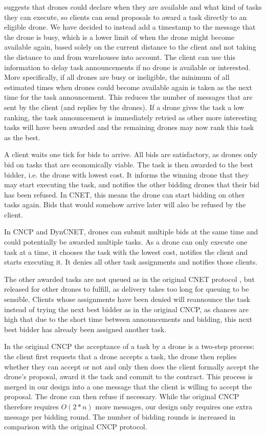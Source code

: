 \documentclass[10pt,a4paper,twocolumn]{article}
\newcommand{\commentV}[1]{\todo[inline, color=yellow]{Victor: #1}}
\begin{document}
\cite{CNET} suggests that drones could declare when they are available and what kind of tasks they can execute, so clients can send proposals to award a task directly to an eligible drone. We have decided to instead add a timestamp to the message that the drone is busy, which is a lower limit of when the drone might become available again, based solely on the current distance to the client and not taking the distance to and from warehouses into account. The client can use this information to delay task announcements if no drone is available or interested. More specifically, if all drones are busy or ineligible, the minimum of all estimated times when drones could become available again is taken as the next time for the task announcement. This reduces the number of messages that are sent by the client (and replies by the drones). If a drone gives the task a low ranking, the task announcement is immediately retried as other more interesting tasks will have been awarded and the remaining drones may now rank this task as the best.

A client waits one tick for bids to arrive. All bids are satisfactory, as drones only bid on tasks that are economically viable. The task is then awarded to the best bidder, i.e. the drone with lowest cost. It informs the winning drone that they may start executing the task, and notifies the other bidding drones that their bid has been refused. In CNET, this means the drone can start bidding on other tasks again. Bids that would somehow arrive later will also be refused by the client.

In CNCP and DynCNET, drones can submit multiple bids at the same time and could potentially be awarded multiple tasks. As a drone can only execute one task at a time, it chooses the task with the lowest cost, notifies the client and starts executing it. It denies all other task assignments and notifies those clients.

The other awarded tasks are not queued as in the original CNET protocol \commentV{of verwijzing naar CNET eruithalen?}, but released for other drones to fulfill, as delivery takes too long for queuing to be sensible. Clients whose assignments have been denied will reannounce the task instead of trying the next best bidder as in the original CNCP, as chances are high that due to the short time between announcements and bidding, this next best bidder has already been assigned another task. 

In the original CNCP the acceptance of a task by a drone is a two-step process: the client first requests that a drone accepts a task, the drone then replies whether they can accept or not and only then does the client formally accept the drone's proposal, award it the task and commit to the contract. This process is merged in our design into a one message that the client is willing to accept the proposal. The drone can then refuse if necessary. While the original CNCP therefore requires $O(2*n)$ more messages, our design only requires one extra message per bidding round.  The number of bidding rounds is increased in comparison with the original CNCP protocol.
\end{document}
